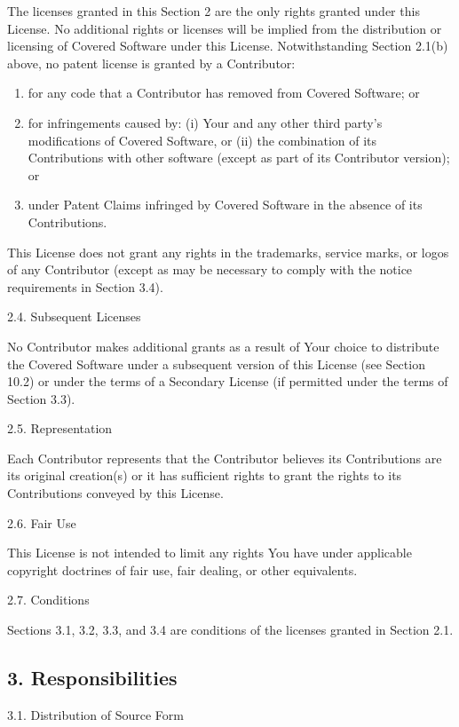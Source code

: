 \documentclass[letterpaper,10pt,english]{sphinxmanual}
\begin{document}
The licenses granted in this Section 2 are the only rights granted under
this License. No additional rights or licenses will be implied from the
distribution or licensing of Covered Software under this License.
Notwithstanding Section 2.1(b) above, no patent license is granted by a
Contributor:
\begin{enumerate}
\def\theenumi{\alph{enumi}}
\def\labelenumi{(\theenumi )}
\makeatletter\def\p@enumii{\p@enumi (\theenumi )}\makeatother
\item {} 
for any code that a Contributor has removed from Covered Software;
or

\item {} 
for infringements caused by: (i) Your and any other third party’s
modifications of Covered Software, or (ii) the combination of its
Contributions with other software (except as part of its Contributor
version); or

\item {} 
under Patent Claims infringed by Covered Software in the absence of
its Contributions.

\end{enumerate}

This License does not grant any rights in the trademarks, service marks,
or logos of any Contributor (except as may be necessary to comply with
the notice requirements in Section 3.4).

2.4. Subsequent Licenses

No Contributor makes additional grants as a result of Your choice to
distribute the Covered Software under a subsequent version of this
License (see Section 10.2) or under the terms of a Secondary License (if
permitted under the terms of Section 3.3).

2.5. Representation

Each Contributor represents that the Contributor believes its
Contributions are its original creation(s) or it has sufficient rights
to grant the rights to its Contributions conveyed by this License.

2.6. Fair Use

This License is not intended to limit any rights You have under
applicable copyright doctrines of fair use, fair dealing, or other
equivalents.

2.7. Conditions

Sections 3.1, 3.2, 3.3, and 3.4 are conditions of the licenses granted
in Section 2.1.


\subsection{3. Responsibilities}
\label{\detokenize{warranty:responsibilities}}
3.1. Distribution of Source Form
\end{document}
